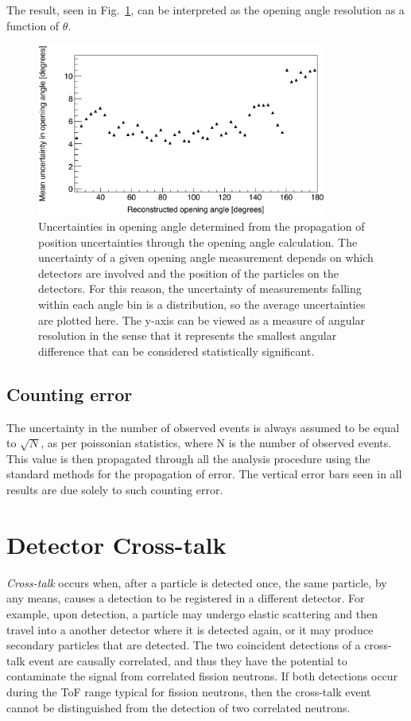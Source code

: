 The result, seen in Fig.~\ref{fig:OpeningAngleRes}, can be interpreted as the opening angle resolution as a function of $\theta$.
\begin{figure}[h]
    \centering
    \includegraphics[width = 0.85\textwidth]{Content/Errors/OpeningAngleUncertainty.png}
    \caption{Uncertainties in opening angle determined from the propagation of position uncertainties through the opening angle calculation.
     The uncertainty of a given opening angle measurement depends on which detectors are involved and the position of the particles on the detectors.
     For this reason, the uncertainty of measurements falling within each angle bin is a distribution, so the average uncertainties are plotted here.
    The y-axis can be viewed as a measure of angular resolution in the sense that it represents the smallest angular difference that can be considered statistically significant.
    }
    \label{fig:OpeningAngleRes}
\end{figure}

\subsection{Counting error}
The uncertainty in the number of observed events is always assumed to be equal to $\sqrt{N}$, as per poissonian  statistics, where N is the number of observed events.
This value is then propagated through all the analysis procedure using the standard methods for the propagation of error.
The vertical error bars seen in all results are due solely to such counting error.

\FloatBarrier
\section{Detector Cross-talk}
\label{crosstalk}
\textit{Cross-talk} occurs when, after a particle is detected once, the same particle, by any means, causes a detection to be registered in a different detector.
For example, upon detection, a particle may undergo elastic scattering and then travel into a another detector where it is detected again, or it may produce secondary particles that are detected.
The two coincident detections of a cross-talk event are causally correlated, and thus they have the potential to contaminate the signal from correlated fission neutrons.
If both detections occur during the ToF range typical for fission neutrons, then the cross-talk event cannot be distinguished from the detection of two correlated neutrons.

